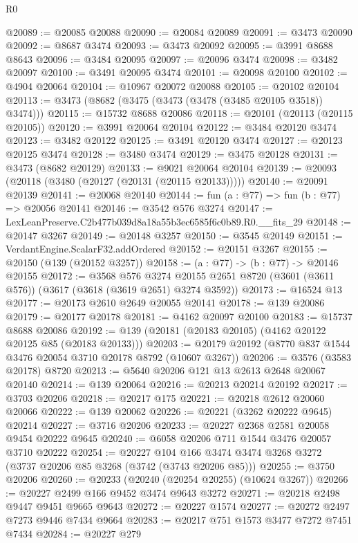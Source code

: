 \begin{lexlean}{R0}
\begin{coremodule}
@20089 := @20085 @20088
@20090 := @20084 @20089
@20091 := @3473 @20090
@20092 := @8687 @3474
@20093 := @3473 @20092
@20095 := @3991 @8688 @8643
@20096 := @3484 @20095
@20097 := @20096 @3474
@20098 := @3482 @20097
@20100 := @3491 @20095 @3474
@20101 := @20098 @20100
@20102 := @4904 @20064
@20104 := @10967 @20072 @20088
@20105 := @20102 @20104
@20113 := @3473 (@8682 (@3475 (@3473 (@3478 (@3485 @20105 @3518)) @3474)))
@20115 := @15732 @8688 @20086
@20118 := @20101 (@20113 (@20115 @20105))
@20120 := @3991 @20064 @20104
@20122 := @3484 @20120 @3474
@20123 := @3482 @20122
@20125 := @3491 @20120 @3474
@20127 := @20123 @20125 @3474
@20128 := @3480 @3474
@20129 := @3475 @20128
@20131 := @3473 (@8682 @20129)
@20133 := @9021 @20064 @20104
@20139 := @20093 (@20118 (@3480 (@20127 (@20131 (@20115 @20133)))))
@20140 := @20091 @20139
@20141 := @20068 @20140
@20144 := fun (a : @77) => fun (b : @77) => @20056 @20141
@20146 := @3542 @576 @3274
@20147 := LexLeanPreserve.C2b477b039d8a18a55b3ec6585f6c0b89.R0.__fits_29
@20148 := @20147 @3267
@20149 := @20148 @3257
@20150 := @3545 @20149
@20151 := VerdantEngine.ScalarF32.addOrdered
@20152 := @20151 @3267
@20155 := @20150 (@139 (@20152 @3257))
@20158 := (a : @77) -> (b : @77) -> @20146 @20155
@20172 := @3568
    @576
    @3274
    @20155
    @2651
    @8720
    (@3601 (@3611 @576))
    (@3617 (@3618 (@3619 @2651) @3274 @3592))
@20173 := @16524 @13
@20177 := @20173 @2610 @2649 @20055 @20141
@20178 := @139 @20086
@20179 := @20177 @20178
@20181 := @4162 @20097 @20100
@20183 := @15737 @8688 @20086
@20192 := @139 (@20181 (@20183 @20105) (@4162 @20122 @20125 @85 (@20183 @20133)))
@20203 := @20179 @20192 (@8770 @837 @1544 @3476 @20054 @3710 @20178 @8792 (@10607 @3267))
@20206 := @3576 (@3583 @20178) @8720
@20213 := @5640 @20206 @121 @13 @2613 @2648 @20067 @20140
@20214 := @139 @20064
@20216 := @20213 @20214 @20192
@20217 := @3703 @20206
@20218 := @20217 @175
@20221 := @20218 @2612 @20060 @20066
@20222 := @139 @20062
@20226 := @20221 (@3262 @20222 @9645) @20214
@20227 := @3716 @20206
@20233 := @20227 @2368 @2581 @20058 @9454 @20222 @9645
@20240 := @6058 @20206 @711 @1544 @3476 @20057 @3710 @20222
@20254 := @20227
    @104
    @166
    @3474
    @3474
    @3268
    @3272
    (@3737 @20206 @85 @3268 (@3742 (@3743 @20206 @85)))
@20255 := @3750 @20206
@20260 := @20233 (@20240 (@20254 @20255) (@10624 @3267))
@20266 := @20227 @2499 @166 @9452 @3474 @9643 @3272
@20271 := @20218 @2498 @9447 @9451 @9665 @9643
@20272 := @20227 @1574
@20277 := @20272 @2497 @7273 @9446 @7434 @9664
@20283 := @20217 @751 @1573 @3477 @7272 @7451 @7434
@20284 := @20227 @279

\end{coremodule}
\end{lexlean}

